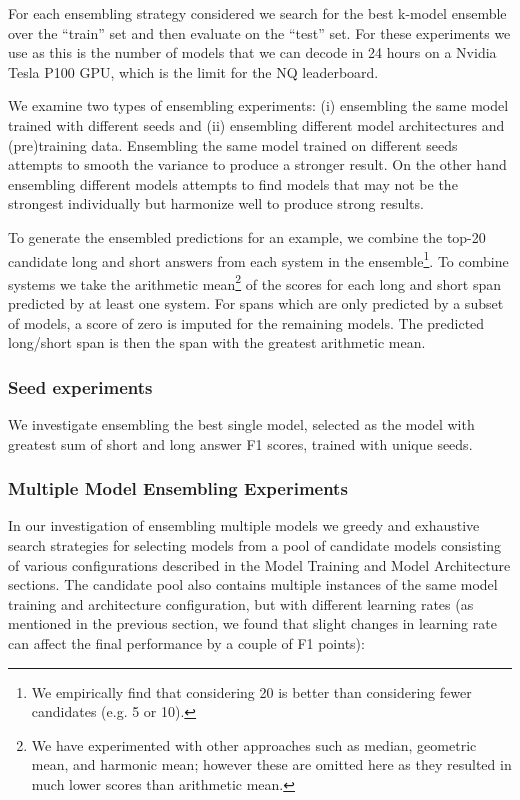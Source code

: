 \documentclass[letterpaper]{article} \usepackage{aaai20}  \usepackage{times}  \usepackage{helvet} \usepackage{courier}  \usepackage[hyphens]{url}  \usepackage{graphicx} \urlstyle{rm} \def\UrlFont{\rm}  \usepackage{graphicx}  \frenchspacing  \setlength{\pdfpagewidth}{8.5in}  \setlength{\pdfpageheight}{11in}  \usepackage{amsmath}
\begin{document}
For each ensembling strategy considered we search for the best k-model ensemble over the ``train'' set and then evaluate on the ``test'' set.  For these experiments we use  as this is the number of models that we can decode in 24 hours on a Nvidia\textsuperscript{\textregistered} Tesla\textsuperscript{\textregistered} P100 GPU, which is the limit for the NQ leaderboard.




We examine two types of ensembling experiments: (i) ensembling the same model trained with different seeds and (ii) ensembling different model architectures and \mbox{(pre\textendash)training} data.  Ensembling the same model trained on different seeds attempts to smooth the variance to produce a stronger result.  On the other hand ensembling different models attempts to find models that may not be the strongest individually but harmonize well to produce strong results.

To generate the ensembled predictions for an example, we combine the top-20 candidate long and short answers from each system in the ensemble\footnote{We empirically find that considering 20 is better than considering fewer candidates (e.g. 5 or 10).}.  To combine systems we take the arithmetic mean\footnote{We have experimented with other approaches such as median, geometric mean, and harmonic mean; however these are omitted here as they resulted in much lower scores than arithmetic mean.} of the scores for each long and short span predicted by at least one system.  For spans which are only predicted by a subset of models, a score of zero is imputed for the remaining models. The predicted long/short span is then the span with the greatest arithmetic mean.

\subsubsection{Seed experiments}
We investigate ensembling the best single model, selected as the model with greatest sum of short and long answer F1 scores, trained with  unique seeds.

\subsubsection{Multiple Model Ensembling Experiments}

In our investigation of ensembling multiple models we greedy and exhaustive search strategies for selecting models from a pool of candidate models consisting of various configurations described in the Model Training and Model Architecture sections. The candidate pool also contains multiple instances of the same model training and architecture configuration, but with different learning rates (as mentioned in the previous section, we found that slight changes in learning rate can affect the final performance by a couple of F1 points):
\end{document}
